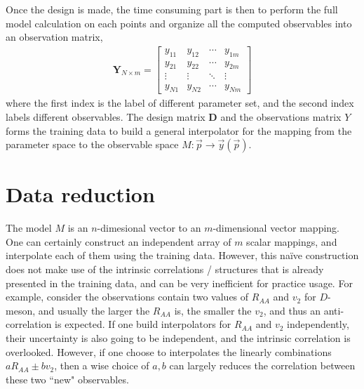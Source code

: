 Once the design is made, the time consuming part is then to perform the full model calculation on each points and organize all the computed observables into an observation matrix,
\begin{eqnarray}
\mathbf{Y}_{N\times m} = 
\begin{bmatrix}
y_{11} & y_{12} & \cdots & y_{1m}\\
y_{21} & y_{22} & \cdots & y_{2m}\\
\vdots & \vdots & \ddots & \vdots \\
y_{N1} & y_{N2} & \cdots & y_{Nm}
\end{bmatrix}
\end{eqnarray}
where the first index is the label of different parameter set, and the second index labels different observables.
The design matrix $\mathbf{D}$ and the observations matrix $Y$ forms the training data to build a general interpolator for the mapping from the parameter space to the observable space $M: \vec{p} \rightarrow \vec{y}(\vec{p})$.

\section{Data reduction}
The model $M$ is an $n$-dimesional vector to an $m$-dimensional vector mapping. 
One can certainly construct an independent array of $m$ scalar mappings, and interpolate each of them using the training data.
However, this na\"ive construction does not make use of the intrinsic correlations / structures that is already presented in the training data, and can be very inefficient for practice usage.
For example, consider the observations contain two values of $R_{AA}$ and $v_2$ for $D$-meson, and usually the larger the $R_{AA}$ is, the smaller the $v_2$, and thus an anti-correlation is expected.
If one build interpolators for $R_{AA}$ and $v_2$ independently, their uncertainty is also going to be independent, and the intrinsic correlation is overlooked.
However, if one choose to interpolates the linearly combinations $a R_{AA} \pm b v_2$, then a wise choice of $a, b$ can largely reduces the correlation between these two ``new" observables.

